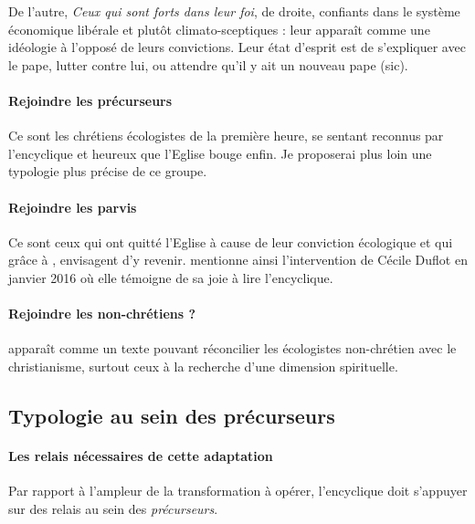  De l'autre, \textit{Ceux qui sont forts dans leur foi},  de droite,   confiants dans le système économique libérale et plutôt climato-sceptiques : \LS leur apparaît comme une idéologie à l'opposé de leurs convictions. Leur état d'esprit est de s'expliquer avec le pape, lutter contre lui, ou attendre qu'il y ait un nouveau pape (sic).
 
\paragraph{Rejoindre les précurseurs} Ce sont les chrétiens écologistes de la première heure, se sentant reconnus par l'encyclique et heureux que l'Eglise bouge enfin. Je proposerai plus loin une typologie plus précise de ce groupe. 

\paragraph{Rejoindre les parvis} Ce sont ceux qui ont quitté l'Eglise à cause de leur conviction écologique et qui grâce à \LS, envisagent d'y revenir. \cite[p. 15]{lang_generations_2020} mentionne ainsi l'intervention de Cécile Duflot en janvier 2016 où elle témoigne de sa joie à lire l'encyclique. 

\paragraph{Rejoindre les non-chrétiens ?} \LS apparaît comme un texte pouvant réconcilier les écologistes non-chrétien avec le christianisme, surtout  ceux à la recherche d'une dimension spirituelle. 


\subsection{Typologie au sein des précurseurs}


\paragraph{Les relais nécessaires de cette adaptation} Par rapport à l'ampleur de la transformation à opérer, l'encyclique doit s'appuyer sur des relais au sein des \textit{précurseurs}. 


